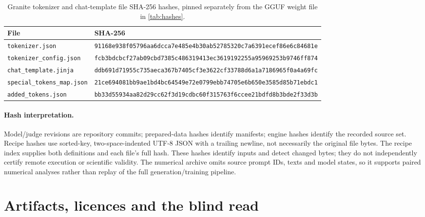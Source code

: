 \documentclass[11pt]{article}
\begin{document}
\begin{table}[t]
  \caption{Granite tokenizer and chat-template file SHA-256 hashes, pinned
    separately from the GGUF weight file in \cref{tab:hashes}.}
  \label{tab:granitepins}
  \centering\footnotesize
  \begin{tabular}{@{}L{3.9cm}L{11.6cm}@{}}
    \toprule
    File & SHA-256 \\
    \midrule
    \texttt{tokenizer.json} & \texttt{91168e938f05796aa6dcca7e485e4b30ab52785320c7a6391ecef86e6c84681e} \\
    \texttt{tokenizer\_config.json} & \texttt{fcb3bdcbcf27ab09cbd7385c486319413ec3619192255a95969253b9746ff874} \\
    \texttt{chat\_template.jinja} & \texttt{ddb691d71955c735aeca367b7405cf3e3622cf33788d6a1a7186965f0a4a69fc} \\
    \texttt{special\_tokens\_map.json} & \texttt{21ce694081bb9ae1bd4bc64549e72e0799ebb74705e6b650e3585d85b71ebdc1} \\
    \texttt{added\_tokens.json} & \texttt{bb33d55934aa82d29cc62f3d19cdbc60f315763f6ccee21bdfd8b3bde2f33d3b} \\
    \bottomrule
  \end{tabular}
\end{table}

\paragraph{Hash interpretation.} Model/judge revisions are repository commits;
prepared-data hashes identify manifests; engine hashes identify the recorded
source set. Recipe hashes use sorted-key, two-space-indented UTF-8 JSON with
a trailing newline, not necessarily the original file bytes. The recipe
index supplies both definitions and each file's full hash. These hashes
identify inputs and detect changed bytes; they do not independently certify
remote execution or scientific validity. The numerical archive omits source
prompt IDs, texts and model states, so it supports paired numerical analyses
rather than replay of the full generation/training pipeline.

\FloatBarrier
\section{Artifacts, licences and the blind read}
\label{app:artifacts}
\end{document}

